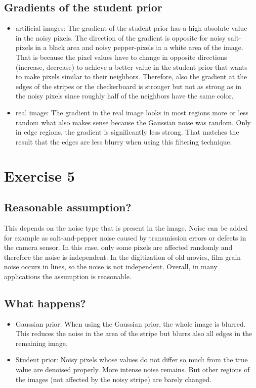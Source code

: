 \documentclass[a4paper,11pt, final]{scrartcl}
\begin{document}
\vspace{1cm}

\subsection*{Gradients of the student prior}
\begin{itemize}
\item artificial images: The gradient of the student prior has a high absolute value in the noisy pixels. The direction of the gradient is opposite for noisy salt-pixels in a black area and noisy pepper-pixels in a white area of the image. That is because the pixel values have to change in opposite directions (increase, decrease) to achieve a better value in the student prior that wants to make pixels similar to their neighbors. Therefore, also the gradient at the edges of the stripes or the checkerboard is stronger but not as strong as in the noisy pixels since roughly half of the neighbors have the same color.
\item real image: The gradient in the real image looks in most regions more or less random what also makes sense because the Gaussian noise was random. Only in edge regions, the gradient is significantly less strong. That matches the result that the edges are less blurry when using this filtering technique.  
\end{itemize}

\section*{Exercise 5}
\subsection*{Reasonable assumption?}
This depends on the noise type that is present in the image. Noise can be added for example as salt-and-pepper noise caused by transmission errors or defects in the camera sensor. In this case, only some pixels are affected randomly and therefore the noise is independent.
In the digitization of old movies, film grain noise occurs in lines, so the noise is not independent.
Overall, in many applications the assumption is reasonable.

\subsection*{What happens?}
\begin{itemize}
\item Gaussian prior: When using the Gaussian prior, the whole image is blurred. This reduces the noise in the area of the stripe but blurrs also all edges in the remaining image.
\item Student prior: Noisy pixels whose values do not differ so much from the true value are denoised properly. More intense noise remains. But other regions of the images (not affected by the noisy stripe) are barely changed.  
\end{itemize}
\end{document}
